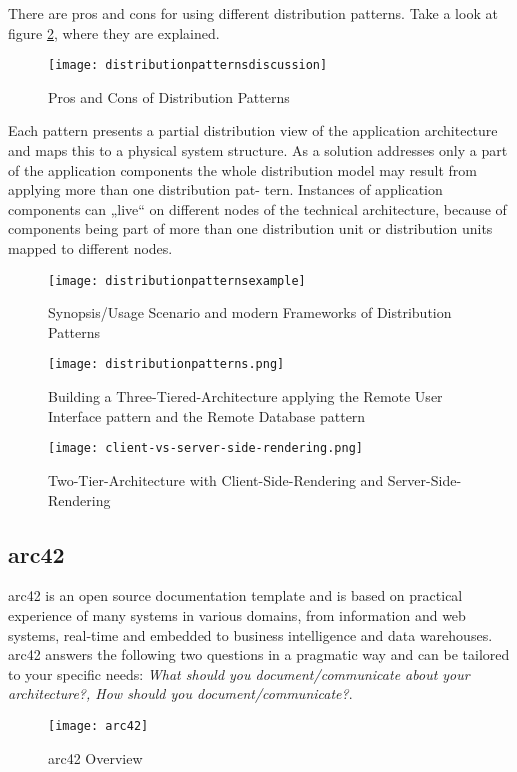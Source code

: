 There are pros and cons for using different distribution patterns. Take a look at figure \ref{fig:dpatternsdiscussion}, where they are explained.

\begin{figure}[H]
  \center
  \texttt{[image: distributionpatternsdiscussion]}
  \caption{Pros and Cons of Distribution Patterns}
  \label{fig:dpatternsdiscussion}
\end{figure}

Each pattern presents a partial distribution view of the application architecture and maps this to a physical system structure. As a solution addresses only a part of the application components the whole distribution model may result from applying more than one distribution pat- tern. Instances of application components can „live“ on different nodes of the technical architecture, because of components being part of more than one distribution unit or distribution units mapped to different nodes.

\begin{figure}[H]
  \center
  \texttt{[image: distributionpatternsexample]}
  \caption{Synopsis/Usage Scenario and modern Frameworks of Distribution Patterns}
  \label{fig:dpatternsdiscussion}
\end{figure}

\begin{figure}[H]
  \center
  \texttt{[image: distributionpatterns.png]}
  \caption{Building a Three-Tiered-Architecture applying the Remote User Interface pattern and the Remote Database pattern}
\end{figure}

\begin{figure}[H]
  \center
  \texttt{[image: client-vs-server-side-rendering.png]}
  \caption{Two-Tier-Architecture with Client-Side-Rendering and Server-Side-Rendering}
\end{figure}

\subsection{arc42}
arc42 is an open source documentation template and is based on practical experience of many systems in various domains, from information and web systems, real-time and embedded to business intelligence and data warehouses. arc42 answers the following two questions in a pragmatic way and can be tailored to your specific needs: \textit{What should you document/communicate about your architecture?,  How should you document/communicate?}.

\begin{figure}[H]
  \center
  \texttt{[image: arc42]}
  \caption{arc42 Overview}
\end{figure}
